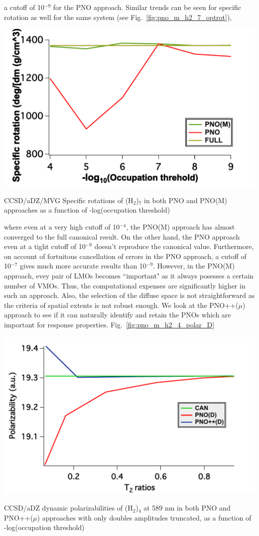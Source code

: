 a cutoff of 10$^{-9}$ for the PNO approach. Similar trends can be seen for specific rotation as well
for the same system (see Fig.~\ref{fig:pno_m_h2_7_optrot}),
\begin{MyFigure}[h!]
\centering
\includegraphics[width=0.6\linewidth,natwidth=610,natheight=642]{figures_pno++/pno_m_h2_7_adz_optrot.pdf}
\caption{{\footnotesize CCSD/aDZ/MVG Specific rotations of (H$_2$)$_7$ in both PNO and PNO(M) approaches
as a function of -log(occupation threshold)}}
\label{fig:pno_m_h2_7_optrot}
\end{MyFigure}
where even at a very high cutoff of 10$^{-4}$, the PNO(M) approach has almost converged to the full 
canonical result. On the other hand, the PNO approach even at a tight cutoff of 10$^{-9}$ doesn't
reproduce the canonical value. Furthermore, on account of fortuitous cancellation of errors in the
PNO approach, a cutoff of 10$^{-7}$ gives much more accurate results than 10$^{-9}$.
However, in the PNO(M) approach, evey pair of LMOs becomes ``important" as it always posesses 
a certain number of VMOs. Thus, the computational expenses are significantly higher in such an
approach. Also, the selection of the diffuse space is not straightforward as the criteria of 
spatial extents is not robust enough. We look at the PNO++($\mu$) approach to see if it can naturally
identify and retain the PNOs which are important for response properties.
Fig.~\ref{fig:pno_m_h2_4_polar_D}
\begin{MyFigure}[h!]
\centering
\includegraphics[width=0.6\linewidth,natwidth=610,natheight=642]{figures_pno++/h2_4_polar_D.pdf}
\caption{{\footnotesize CCSD/aDZ dynamic polarizabilities of (H$_2$)$_4$ at 589 nm in both PNO and PNO++($\mu$) approaches
with only doubles amplitudes truncated, as a function of -log(occupation threshold)}}
\label{fig:pno_m_h2_4_polar_D}
\end{MyFigure}
